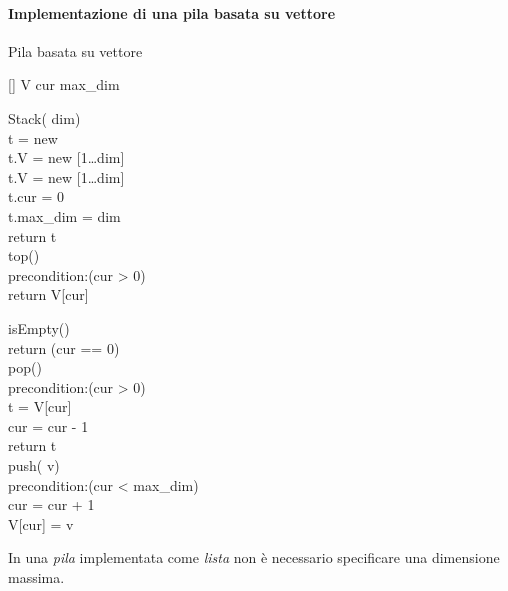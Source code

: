 \paragraph{Implementazione di una pila basata su vettore}
\begin{code}{Pila basata su vettore}
    \begin{minipage}[t]{0.48\textwidth}
        [] V\hfill{}
         cur\hfill{}
         max\_dim\hfill{}

        \ind{} Stack( dim)\\
             t = new \\
            t.V = new [1\dots dim]\\
            t.V = new [1\dots dim]\\
            t.cur = 0\\
            t.max\_dim = dim\\
            return t\\
        
        \ind{} top()\\
            precondition:(cur > 0)\\
            return V[cur]
    \end{minipage}
    \hfill
    \begin{minipage}[t]{0.48\textwidth}
        \ind{} isEmpty()\\
            return (cur == 0)\\

        \ind{} pop()\\
            precondition:(cur > 0)\\
             t = V[cur]\\
            cur = cur - 1\\
            return t\\

        \ind push( v)\\
            precondition:(cur < max\_dim)\\
            cur = cur + 1\\
            V[cur] = v
    \end{minipage}
\end{code}
\begin{note}
    In una \emph{pila} implementata come \emph{lista} non è necessario specificare
    una dimensione massima.
\end{note}

